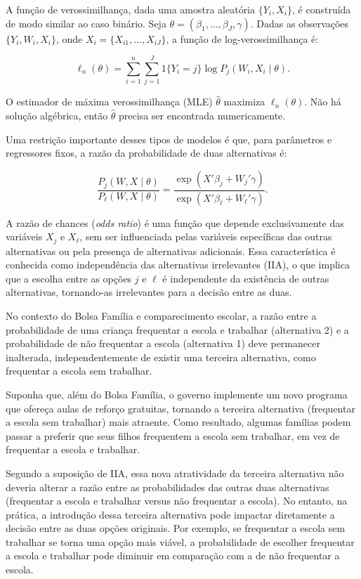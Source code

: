 \documentclass[12pt]{article}
\theoremstyle{break}
\begin{document}
A função de verossimilhança, dada uma amostra aleatória \( \{Y_i, X_i\} \), é construída de modo similar ao caso binário. Seja \( \theta = ({\beta}_1, \dots, {\beta}_J, {\gamma}) \). Dadas as observações \( \{Y_i, W_i, X_i\} \), onde \( X_i = \{X_{i1}, \dots, X_{iJ}\} \), a função de log-verossimilhança é:

\[
\ell_n(\theta) = \sum_{i=1}^{n} \sum_{j=1}^{J} 1\{Y_i = j\} \log P_j(W_i, X_i \mid \theta).
\]

O estimador de máxima verossimilhança (MLE) \( \hat{\theta} \) maximiza \( \ell_n(\theta) \). Não há solução algébrica, então \( \hat{\theta} \) precisa ser encontrada numericamente.

Uma restrição importante desses tipos de modelos é que, para parâmetros e regressores fixos, a razão da probabilidade de duas alternativas é:

\[
\frac{P_j(W, X \mid \theta)}{P_\ell(W, X \mid \theta)} = \frac{\exp\left( {X}' {\beta}_j + {W}_j' {\gamma} \right)}{\exp\left( {X}' {\beta}_\ell + {W}_\ell' {\gamma} \right)}.
\]

A razão de chances (\textit{odds ratio}) é uma função que depende exclusivamente das variáveis \( {X}_j \) e \( {X}_\ell \), sem ser influenciada pelas variáveis específicas das outras alternativas ou pela presença de alternativas adicionais. Essa característica é conhecida como independência das alternativas irrelevantes (IIA), o que implica que a escolha entre as opções \( j \) e \( \ell \) é independente da existência de outras alternativas, tornando-as irrelevantes para a decisão entre as duas.

No contexto do Bolsa Família e comparecimento escolar, a razão entre a probabilidade de uma criança frequentar a escola e trabalhar (alternativa 2) e a probabilidade de não frequentar a escola (alternativa 1) deve permanecer inalterada, independentemente de existir uma terceira alternativa, como frequentar a escola sem trabalhar.

Suponha que, além do Bolsa Família, o governo implemente um novo programa que ofereça aulas de reforço gratuitas, tornando a terceira alternativa (frequentar a escola sem trabalhar) mais atraente. Como resultado, algumas famílias podem passar a preferir que seus filhos frequentem a escola sem trabalhar, em vez de frequentar a escola e trabalhar.

Segundo a suposição de IIA, essa nova atratividade da terceira alternativa não deveria alterar a razão entre as probabilidades das outras duas alternativas (frequentar a escola e trabalhar versus não frequentar a escola). No entanto, na prática, a introdução dessa terceira alternativa pode impactar diretamente a decisão entre as duas opções originais. Por exemplo, se frequentar a escola sem trabalhar se torna uma opção mais viável, a probabilidade de escolher frequentar a escola e trabalhar pode diminuir em comparação com a de não frequentar a escola.
\end{document}
